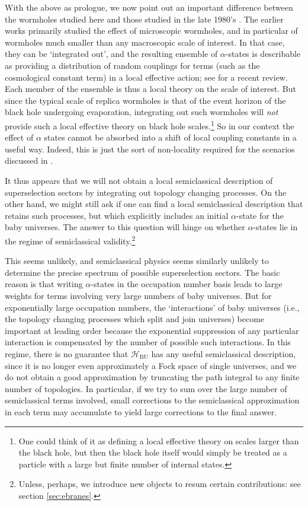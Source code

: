 \documentclass[letterpaper,12pt]{article}
\newcommand*{\hbu}{\mathcal{H}_\text{BU}} %
\begin{document}
With the above as prologue, we now point out an important difference between the wormholes studied here and those studied in the late 1980's \cite{Coleman:1988cy,Giddings:1988cx,Preskill:1988na}. The earlier works primarily studied the effect of microscopic wormholes, and in particular of wormholes much smaller than any macroscopic scale of interest. In that case, they can be `integrated out', and the resulting ensemble of $\alpha$-states is describable as providing a distribution of random couplings for terms (such as the cosmological constant term) in a local effective action; see \cite{Hebecker:2018ofv} for a recent review. Each member of the ensemble is thus a local theory on the scale of interest. But since the typical scale of replica wormholes is that of the event horizon of the black hole undergoing evaporation, integrating out such wormholes will \emph{not} provide such a local effective theory on black hole scales.\footnote{One could think of it as defining a local effective theory on scales larger than the black hole, but then the black hole itself would simply be treated as a particle with a large but finite number of internal states.} So in our context the effect of $\alpha$ states cannot be absorbed into a shift of local coupling constants in a useful way. Indeed, this is just the sort of non-locality required for the scenarios discussed in \cite{Giddings:2011ks,Giddings:2012gc}.

It thus appears that we will not obtain a local semiclassical description of superselection sectors by integrating out topology changing processes. On the other hand, we might still ask if one can find a local semiclassical description that retains such processes, but which explicitly includes an initial $\alpha$-state for the baby universes.   The answer to this question will hinge on whether
$\alpha$-states lie in the regime of semiclassical validity.\footnote{Unless, perhaps, we introduce new objects to resum certain contributions: see section \ref{sec:ebranes}.}

This seems unlikely, and  semiclassical physics seems similarly unlikely to determine the precise spectrum of possible superselection sectors. The basic reason is that writing $\alpha$-states in the occupation number basis leads to large weights for terms involving very large numbers of baby universes. But for exponentially large occupation numbers, the `interactions' of baby universes (i.e., the topology changing processes which split and join universes) become important at leading order because the exponential suppression of any particular interaction is compensated by the number of possible such interactions. In this regime, there is no guarantee that $\hbu$ has any useful semiclassical description, since it is no longer even approximately a Fock space of single universes, and we do not obtain a good approximation by truncating the path integral to any finite number of topologies.  In particular, if we try to sum over the large number of semiclassical terms involved, small corrections to the semiclassical approximation in each term may accumulate to yield large corrections to the final answer.
\end{document}
